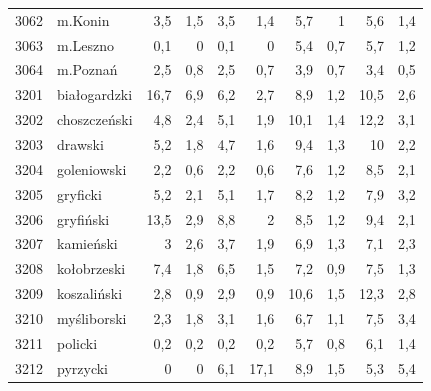 \begin{center}
\begin{longtable}{lp{3cm}rrrrrrrr}
3062 & m.Konin                 & 3,5     & 1,5         & 3,5      & 1,4          & 5,7      & 1            & 5,6      & 1,4          \\
3063 & m.Leszno                & 0,1     & 0           & 0,1      & 0            & 5,4      & 0,7          & 5,7      & 1,2          \\
3064 & m.Poznań                & 2,5     & 0,8         & 2,5      & 0,7          & 3,9      & 0,7          & 3,4      & 0,5          \\
3201 & białogardzki            & 16,7    & 6,9         & 6,2      & 2,7          & 8,9      & 1,2          & 10,5     & 2,6          \\
3202 & choszczeński            & 4,8     & 2,4         & 5,1      & 1,9          & 10,1     & 1,4          & 12,2     & 3,1          \\
3203 & drawski                 & 5,2     & 1,8         & 4,7      & 1,6          & 9,4      & 1,3          & 10       & 2,2          \\
3204 & goleniowski             & 2,2     & 0,6         & 2,2      & 0,6          & 7,6      & 1,2          & 8,5      & 2,1          \\
3205 & gryficki                & 5,2     & 2,1         & 5,1      & 1,7          & 8,2      & 1,2          & 7,9      & 3,2          \\
3206 & gryfiński               & 13,5    & 2,9         & 8,8      & 2            & 8,5      & 1,2          & 9,4      & 2,1          \\
3207 & kamieński               & 3       & 2,6         & 3,7      & 1,9          & 6,9      & 1,3          & 7,1      & 2,3          \\
3208 & kołobrzeski             & 7,4     & 1,8         & 6,5      & 1,5          & 7,2      & 0,9          & 7,5      & 1,3          \\
3209 & koszaliński             & 2,8     & 0,9         & 2,9      & 0,9          & 10,6     & 1,5          & 12,3     & 2,8          \\
3210 & myśliborski             & 2,3     & 1,8         & 3,1      & 1,6          & 6,7      & 1,1          & 7,5      & 3,4          \\
3211 & policki                 & 0,2     & 0,2         & 0,2      & 0,2          & 5,7      & 0,8          & 6,1      & 1,4          \\
3212 & pyrzycki                & 0       & 0           & 6,1      & 17,1         & 8,9      & 1,5          & 5,3      & 5,4          \\

\end{longtable}
\end{center}
